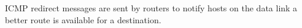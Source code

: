 ICMP redirect messages are sent by routers to notify hosts on the data link a better route is available for a destination.